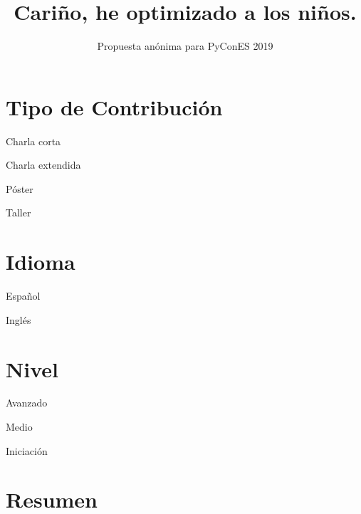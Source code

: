 \documentclass[runningheads]{llncs}
\newcommand{\cmark}{\ding{51}}%
\newcommand{\done}{\rlap{$\square$}{\raisebox{2pt}{\large\hspace{1pt}\cmark}}%
\hspace{-2.5pt}}
\begin{document}
\pagestyle{headings}
\mainmatter


\title{Cariño, he optimizado a los niños.} %


\author{Propuesta an\'onima para PyConES 2019}

\maketitle

\section{Tipo de Contribuci\'on}

\begin{todolist}
  \item Charla corta
  \item [\done]Charla extendida
  \item P\'oster
  \item Taller
  \end{todolist}


\section{Idioma}
\begin{todolist}
  \item [\done]Espa\~nol
  \item Ingl\'es
\end{todolist}
\section{Nivel}

\begin{todolist}
  \item Avanzado
  \item [\done] Medio
  \item Iniciaci\'on
  \end{todolist}


\newpage

\section{Resumen}
\end{document}
